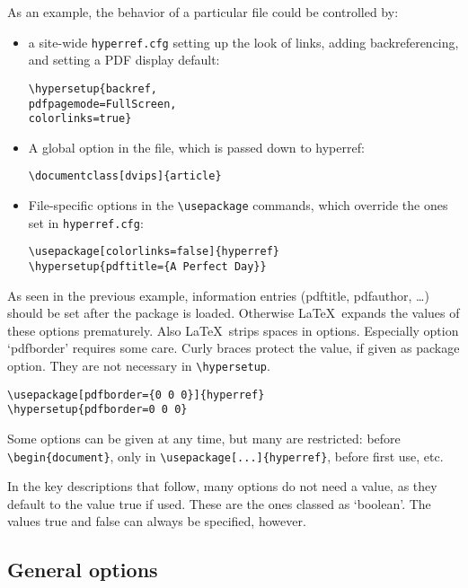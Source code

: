 \documentclass{article}
\newcommand*{\cs}[1]{%
  \texttt{\textbackslash #1}%
}
\newcommand*{\xpackage}[1]{\textsf{#1}}
\begin{document}
As an example, the behavior of a particular file could be controlled by:
\begin{itemize}

\item	a site-wide \texttt{hyperref.cfg} setting up the look of links,
adding backreferencing, and setting a PDF display default:

\begin{verbatim}
\hypersetup{backref,
pdfpagemode=FullScreen,
colorlinks=true}
\end{verbatim}

\item	A global option in the file, which is passed down to
\xpackage{hyperref}:

\begin{verbatim}
\documentclass[dvips]{article}
\end{verbatim}

\item	File-specific options in the \cs{usepackage} commands, which
override the ones set in \texttt{hyperref.cfg}:

\begin{verbatim}
\usepackage[colorlinks=false]{hyperref}
\hypersetup{pdftitle={A Perfect Day}}
\end{verbatim}
\end{itemize}

As seen in the previous example, information entries
(pdftitle, pdfauthor, \dots) should be set after the package is loaded.
Otherwise \LaTeX\ expands the values of these options prematurely.
Also \LaTeX\ strips spaces in options. Especially option `pdfborder'
requires some care. Curly braces protect the value, if given
as package option. They are not necessary in \verb|\hypersetup|.

\begin{verbatim}
\usepackage[pdfborder={0 0 0}]{hyperref}
\hypersetup{pdfborder=0 0 0}
\end{verbatim}

Some options can be given at any time, but many are restricted: before
\verb|\begin{document}|, only in \verb|\usepackage[...]{hyperref}|,
before first use, etc.

In the key descriptions that follow, many options do not need a value,
as they default to the value true if used. These are the ones classed as
`boolean'. The values true and false can always be specified, however.


\subsection{General options}
\end{document}
